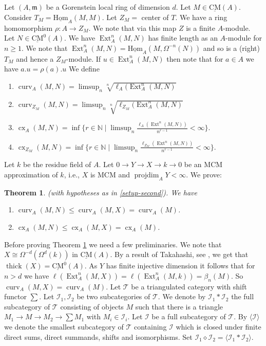 \documentclass{amsart}
\newcommand{\m}{\mathfrak{m} }
\newcommand{\Ic}{\mathcal{I} }
\newcommand{\Tc}{\mathcal{T} }
\newcommand{\rt}{\rightarrow}
\newcommand{\cx}{\operatorname{cx}}
\newcommand{\curv}{\operatorname{curv}}
\newcommand{\CMS}{\operatorname{\underline{CM}}}
\newcommand{\projdim}{\operatorname{projdim}}
\newcommand{\sHom}{\operatorname{\underline{Hom}}}
\newcommand{\Ext}{\operatorname{Ext}}
\newcommand{\thick}{\operatorname{thick}}
\theoremstyle{plain}
\newtheorem{theorem}{Theorem}[section]
\theoremstyle{definition}
\theoremstyle{remark}
\begin{document}
{\s\label{setup-second} Let $(A,\m)$ be a Gorenstein local ring of dimension $d$. Let $M \in \CMS(A)$. Consider $T_M = \sHom_A(M, M)$.  Let $Z_M = $ center of $T$.  We have a ring homomorphism $\rho \colon A \rt Z_M$. We note that via this map $Z$ is a finite $A$-module. Let $N \in \CMS^0(A)$. We have $\Ext^n_A(M, N)$ has finite length as an $A$-module for $n \geq 1$. We note that $\Ext^n_A(M, N) = \sHom_A(M, \Omega^{-n}(N))$ and so is a  (right) $T_M$ and hence a  $Z_M$-module. If $u \in \Ext^n_A(M, N)$ then note that for $a \in A$ we have $a.u = \rho(a).u$
We define
\begin{enumerate}
  \item  $\curv_A(M, N) = \limsup_n \sqrt[n]{\ell_A(\Ext^n_A(M, N)}$
  \item $\curv_{Z_M}(M, N) = \limsup_n \sqrt[n]{\ell_{Z_M}(\Ext^n_A(M, N)}$
  \item $\cx_A(M, N)  = \inf\{ r \in \mathbb{N} \mid  \limsup_n \frac{\ell_A(\Ext^n(M, N))}{n^{r - 1}}  < \infty \}.$
  \item $\cx_{Z_M}(M, N)  = \inf\{ r \in \mathbb{N} \mid  \limsup_n \frac{\ell_{Z_M}(\Ext^n(M, N))}{n^{r - 1}}  < \infty \}.$
\end{enumerate}
Let $k$ be the residue field of $A$. Let $0 \rt Y \rt X \rt k \rt 0$ be an MCM approximation of $k$, i.e., $X$ is MCM and $\projdim_A Y < \infty$. We prove:
\begin{theorem}
\label{growth} (with hypotheses as in \ref{setup-second}). We have
\begin{enumerate}[\rm (1)]
  \item $\curv_A(M, N) \leq \curv_A(M,X) = \curv_A(M)$.
  \item $\cx_A(M, N) \leq \cx_A(M, X) = \cx_A(M)$.
\end{enumerate}
\end{theorem}
Before proving Theorem \ref{growth} we need a few preliminaries.  We note that $X \cong \Omega^{-d}(\Omega^d(k))$ in $\CMS(A)$. By a result of Takahashi, see \cite[4.3]{T-p}, we get that \\
$\thick(X) = \CMS^0(A)$. As $Y$ has finite injective dimension it follows that for $n > d$ we have  $\ell(\Ext^n_A(M, X)) = \ell (\Ext^n_A(M, k)) = \beta_n(M)$. So $\curv_A(M, X) = \curv_A(M)$.
\s\label{t-r} Let $\Tc$ be a triangulated category with shift functor $\sum$. Let $\Ic_1, \Ic_2$ be two subcategories of $\Tc$. We denote by $\Ic_1 * \Ic_2$ the full subcategory  of $\Tc$ consisting of objects $M$  such that there is a  triangle  $M_1 \rt M \rt M_2 \rt \sum M_1$ with $M_i \in \Ic_i$.
Let $\Ic$ be a full subcategory of $\Tc$. By $\langle \Ic  \rangle$ we denote the smallest subcategory of $\Tc$ containing $\Ic$  which is closed under finite direct sums, direct summands, shifts and isomorphisms. Set  $\Ic_1 \diamond \Ic_2 = \langle  \Ic_1 * \Ic_2 \rangle$.

}
\end{document}
